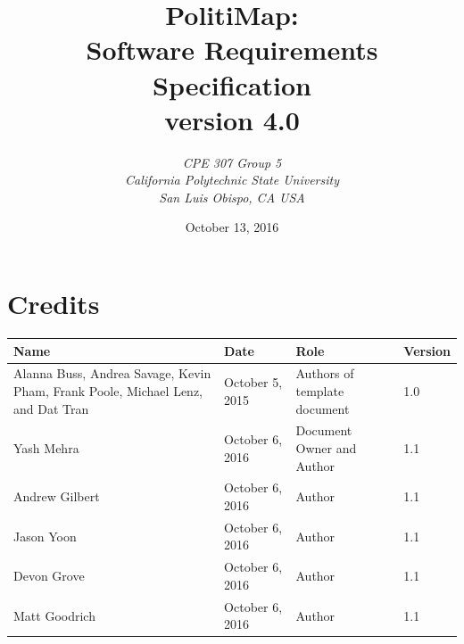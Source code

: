 \documentclass[12pt,oneside,letterpaper]{article}
\title{\bfseries PolitiMap: \\
Software Requirements Specification\\
version 4.0}
\author {\emph{CPE 307 Group 5}\\
\emph{California Polytechnic State University}\\
\emph{San Luis Obispo, CA USA}}
\date{October 13, 2016}
\begin{document}
\thispagestyle{empty}\maketitle
\newpage

\tableofcontents
\newpage

\section*{Credits}
\begin{tabu}{|X[.75]|l|X|l|}
\hline
\textbf{Name} & \textbf{Date} & \textbf{Role} & \textbf{Version} \\
\hline
Alanna Buss, Andrea Savage, Kevin Pham, Frank Poole, Michael Lenz, and Dat Tran & October 5, 2015 & Authors of template document & 1.0 \\
\hline
Yash Mehra & October 6, 2016 & Document Owner and Author & 1.1 \\
\hline
Andrew Gilbert & October 6, 2016 & Author & 1.1 \\
\hline
Jason Yoon & October 6, 2016 & Author & 1.1 \\
\hline
Devon Grove & October 6, 2016 & Author & 1.1 \\
\hline
Matt Goodrich & October 6, 2016 & Author & 1.1 \\
\hline
\end{tabu}
\end{document}
